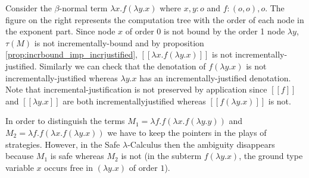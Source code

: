 \documentclass{llncs}
\newcommand{\lsem}{[\![} %
\newcommand{\rsem}{]\!]} %
\newcommand{\sem}[1]{{\lsem #1 \rsem}}
\newcommand{\tree}[2][levelsep=3.5ex]{\pstree[levelsep=3.5ex,#1]{\TR{#2}}}
\begin{document}
\parpic[r]{
    \tree{$\lambda x^3$}{\tree{$f^2$}{ \tree{$\lambda y^1$}{ \TR{$x^0$} }}}
}

\begin{example}
Consider the $\beta$-normal term $\lambda
x . f (\lambda y .x)$ where $x,y:o$ and $f:(o,o),o$. The figure on
the right represents the computation tree with the order of each
node in the exponent part. Since node $x$ of order $0$ is not bound
by the order 1 node $\lambda y$, $\tau(M)$ is not
incrementally-bound and by proposition
\ref{prop:incrbound_imp_incrjustified}, $\sem{\lambda x . f (\lambda
y .x)}$ is not incrementally-justified. Similarly we can check that
the denotation of $f (\lambda y .x)$ is not incrementally-justified
whereas $\lambda y. x$ has an incrementally-justified denotation.
Note that incremental-justification is not preserved by application since $\sem{f}$ 
and $\sem{\lambda y. x}$ are both incrementally\-justified whereas $\sem{f (\lambda y .x)}$ is not.
\end{example}

\begin{example}
In order to distinguish the terms $M_1 = \lambda f . f
(\lambda x . f (\lambda y .y ))$ and $M_2 = \lambda f . f (\lambda x
. f (\lambda y .x ))$ we have to keep the pointers in the plays of
strategies. However, in the Safe $\lambda$-Calculus then the ambiguity disappears because $M_1$ is
safe whereas $M_2$ is not (in the subterm $f (\lambda y . x)$, the
ground type variable $x$ occurs free in $(\lambda y . x)$ of order $1$).
\end{example}
\end{document}
